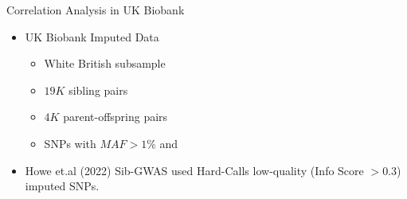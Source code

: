 \documentclass{beamer}
\begin{document}

\begin{frame}{Correlation Analysis in UK Biobank}
      \begin{itemize}
            \item UK Biobank Imputed Data
            \vspace{10pt}
            \begin{itemize}
                  \item White British subsample
                  \vspace{10pt}
                  \item \(19K\) sibling pairs
                  \vspace{10pt}
                  \item \(4K\) parent-offspring pairs
                  \vspace{10pt}
                  \item SNPs with \(MAF>1\%\) and  %
            \end{itemize}
      \vspace{15pt}
      \item Howe et.al (2022) Sib-GWAS used Hard-Calls low-quality (Info Score \(> 0.3\)) imputed SNPs. %
      \end{itemize}
\end{frame}
\end{document}
